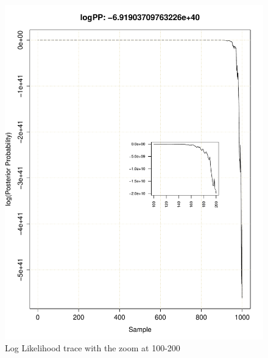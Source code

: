 \documentclass[11pt]{labbook}
\begin{document}
    \begin{figure}
        \centering
        \includegraphics[scale=.75]{FONSE_Plots/2016/June_29/LogLikeTrace_100-200}
        \caption{Log Likelihood trace with the zoom at 100-200}
        \label{fig:JUN29_100-200}
    \end{figure}
\end{document}
